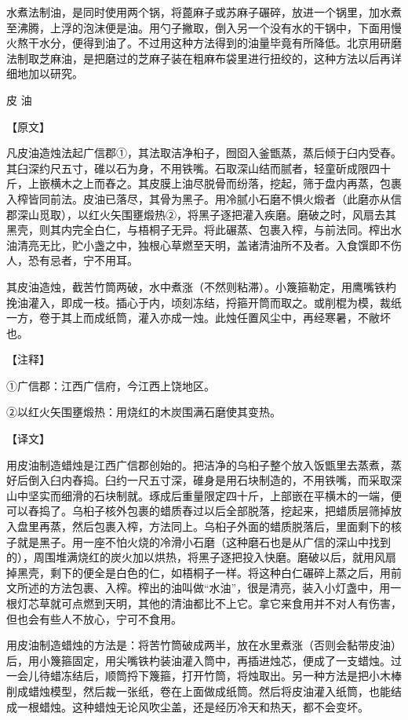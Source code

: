 \documentclass[12pt,UTF8]{ctexbook}
\begin{document}
水煮法制油，是同时使用两个锅，将蓖麻子或苏麻子碾碎，放进一个锅里，加水煮至沸腾，上浮的泡沫便是油。用勺子撇取，倒入另一个没有水的干锅中，下面用慢火熬干水分，便得到油了。不过用这种方法得到的油量毕竟有所降低。北京用研磨法制取芝麻油，是把磨过的芝麻子装在粗麻布袋里进行扭绞的，这种方法以后再详细地加以研究。

皮 油

【原文】

凡皮油造烛法起广信郡①，其法取洁净桕子，囫囵入釜甑蒸，蒸后倾于臼内受舂。其臼深约尺五寸，碓以石为身，不用铁嘴。石取深山结而腻者，轻童斫成限四十斤，上嵌横木之上而舂之。其皮膜上油尽脱骨而纷落，挖起，筛于盘内再蒸，包裹入榨皆同前法。皮油已落尽，其骨为黑子。用冷腻小石磨不惧火煅者（此磨亦从信郡深山觅取），以红火矢围壅煅热②，将黑子逐把灌入疾磨。磨破之时，风扇去其黑壳，则其内完全白仁，与梧桐子无异。将此碾蒸、包裹入榨，与前法同。榨出水油清亮无比，贮小盏之中，独根心草燃至天明，盖诸清油所不及者。入食馔即不伤人，恐有忌者，宁不用耳。

其皮油造烛，截苦竹筒两破，水中煮涨（不然则粘滞）。小篾箍勒定，用鹰嘴铁杓挽油灌入，即成一枝。插心于内，顷刻冻结，捋箍开筒而取之。或削棍为模，裁纸一方，卷于其上而成纸筒，灌入亦成一烛。此烛任置风尘中，再经寒暑，不敝坏也。

【注释】

①广信郡：江西广信府，今江西上饶地区。

②以红火矢围壅煅热：用烧红的木炭围满石磨使其变热。

【译文】

用皮油制造蜡烛是江西广信郡创始的。把洁净的乌桕子整个放入饭甑里去蒸煮，蒸好后倒入臼内舂捣。臼约一尺五寸深，碓身是用石块制造的，不用铁嘴，而采取深山中坚实而细滑的石块制就。琢成后重量限定四十斤，上部嵌在平横木的一端，便可以舂捣了。乌桕子核外包裹的蜡质舂过以后全部脱落，挖起来，把蜡质层筛掉放入盘里再蒸，然后包裹入榨，方法同上。乌桕子外面的蜡质脱落后，里面剩下的核子就是黑子。用一座不怕火烧的冷滑小石磨（这种磨石也是从广信的深山中找到的），周围堆满烧红的炭火加以烘热，将黑子逐把投入快磨。磨破以后，就用风扇掉黑壳，剩下的便全是白色的仁，如梧桐子一样。将这种白仁碾碎上蒸之后，用前文所述的方法包裹、入榨。榨出的油叫做“水油”，很是清亮，装入小灯盏中，用一根灯芯草就可点燃到天明，其他的清油都比不上它。拿它来食用并不对人有伤害，但也会有些人不放心，宁可不食用。

用皮油制造蜡烛的方法是：将苦竹筒破成两半，放在水里煮涨（否则会黏带皮油）后，用小篾箍固定，用尖嘴铁杓装油灌入筒中，再插进烛芯，便成了一支蜡烛。过一会儿待蜡冻结后，顺筒捋下篾箍，打开竹筒，将烛取出。另一种方法是把小木棒削成蜡烛模型，然后裁一张纸，卷在上面做成纸筒。然后将皮油灌入纸筒，也能结成一根蜡烛。这种蜡烛无论风吹尘盖，还是经历冷天和热天，都不会变坏。
\end{document}
